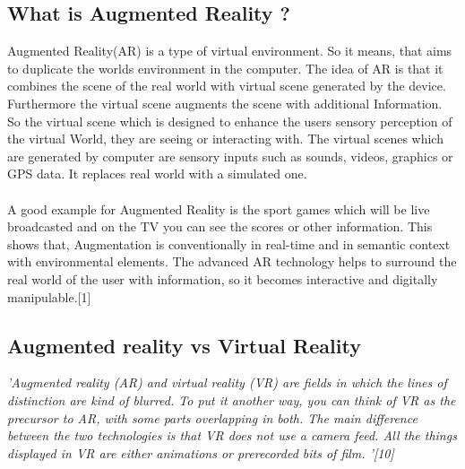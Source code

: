 \subsection{What is Augmented Reality ?}
Augmented Reality(AR) is a type of  virtual environment. So it means, that aims to duplicate the worlds environment in the computer. The idea of AR is that it combines the scene of the real world with virtual scene generated by the device. Furthermore the virtual scene augments the scene with additional Information. So the virtual scene which is designed to enhance the users sensory perception of the virtual World, they are seeing or interacting with. The virtual scenes which are generated by computer are sensory inputs such as sounds, videos, graphics or GPS data. It replaces real world with a simulated one.
\\\\
A good example for Augmented Reality is the sport games which will be live broadcasted and on the TV you can see the scores or other information. This shows that,  Augmentation is conventionally in real-time and in semantic context with environmental elements. The advanced AR technology helps to surround the real world of the user with information, so it becomes interactive and digitally manipulable.[1]
\\
\subsection{Augmented reality vs Virtual Reality}

\textit{'Augmented reality (AR) and virtual reality (VR) are fields in which the lines of
distinction are kind of blurred. To put it another way, you can think of VR as the
precursor to AR, with some parts overlapping in both. The main difference
between the two technologies is that VR does not use a camera feed. All the
things displayed in VR are either animations or prerecorded bits of film.
'[10]}
